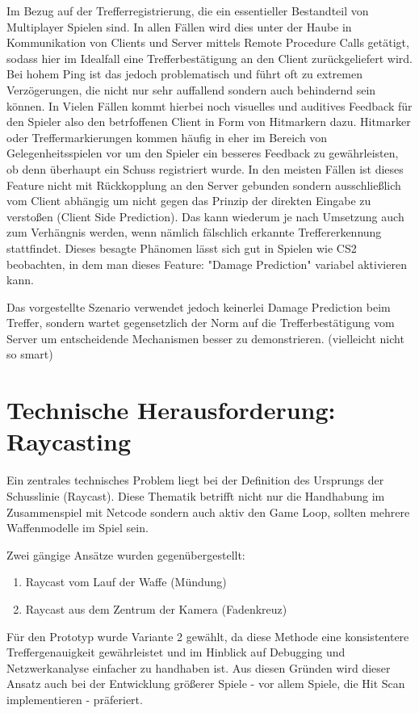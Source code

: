 Im Bezug auf der Trefferregistrierung, die ein essentieller Bestandteil von Multiplayer Spielen sind. In allen Fällen wird dies unter der Haube in Kommunikation von Clients und Server mittels Remote Procedure Calls getätigt, sodass hier im Idealfall eine Trefferbestätigung an den Client zurückgeliefert wird. Bei hohem Ping ist das jedoch problematisch und führt oft zu extremen Verzögerungen, die nicht nur sehr auffallend sondern auch behindernd sein können. In Vielen Fällen kommt hierbei noch visuelles und auditives Feedback für den Spieler also den betrfoffenen Client in Form von Hitmarkern dazu. Hitmarker oder Treffermarkierungen kommen häufig in eher im Bereich von Gelegenheitsspielen vor um den Spieler ein besseres Feedback zu gewährleisten, ob denn überhaupt ein Schuss registriert wurde. 
In den meisten Fällen ist dieses Feature nicht mit Rückkopplung an den Server gebunden sondern ausschließlich vom Client abhängig um nicht gegen das Prinzip der direkten Eingabe zu verstoßen (Client Side Prediction). Das kann wiederum je nach Umsetzung auch zum Verhängnis werden, wenn nämlich fälschlich erkannte Treffererkennung stattfindet. Dieses besagte Phänomen lässt sich gut in Spielen wie CS2 beobachten, in dem man dieses Feature: "Damage Prediction" variabel aktivieren kann. 

Das vorgestellte Szenario verwendet jedoch keinerlei Damage Prediction beim Treffer, sondern wartet gegensetzlich der Norm auf die Trefferbestätigung vom Server um entscheidende Mechanismen besser zu demonstrieren. (vielleicht nicht so smart)

\section{Technische Herausforderung: Raycasting}
Ein zentrales technisches Problem liegt bei der Definition des Ursprungs der Schusslinie (Raycast). Diese Thematik betrifft nicht nur die Handhabung im Zusammenspiel mit Netcode sondern auch aktiv den Game Loop, sollten mehrere Waffenmodelle im Spiel sein. 

Zwei gängige Ansätze wurden gegenübergestellt:

\begin{enumerate}
  \item Raycast vom Lauf der Waffe (Mündung)
  \item Raycast aus dem Zentrum der Kamera (Fadenkreuz)
\end{enumerate}

Für den Prototyp wurde Variante 2 gewählt, da diese Methode eine konsistentere Treffergenauigkeit gewährleistet und im Hinblick auf Debugging und Netzwerkanalyse einfacher zu handhaben ist. Aus diesen Gründen wird dieser Ansatz auch bei der Entwicklung größerer Spiele - vor allem Spiele, die Hit Scan implementieren - präferiert. 


